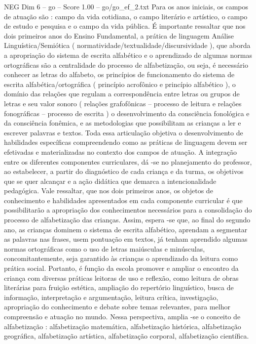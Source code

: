 \begin{textsample}{NEG Dim 6 – go – Score 1.00 – go/go\_ef\_2.txt}
Para os anos iniciais, os campos de atuação são : campo da vida cotidiana, o campo literário e artístico, o campo de estudo e pesquisa e o campo da vida pública.
É importante ressaltar que nos dois primeiros anos do Ensino Fundamental, a prática de linguagem Análise Linguística/Semiótica ( normatividade/textualidade/discursividade ), que aborda a apropriação do sistema de escrita alfabético e o aprendizado de algumas normas ortográficas são a centralidade do processo de alfabetização, ou seja, é necessário conhecer as letras do alfabeto, os princípios de funcionamento do sistema de escrita alfabética/ortográfica ( princípio acrofônico e princípio alfabético ), o domínio das relações que regulam a correspondência entre letras ou grupos de letras e seu valor sonoro ( relações grafofônicas – processo de leitura e relações fonográficas – processo de escrita ) o desenvolvimento da consciência fonológica e da consciência fonêmica, e as metodologias que possibilitam as crianças a ler e escrever palavras e textos.
Toda essa articulação objetiva o desenvolvimento de habilidades específicas compreendendo como as práticas de linguagem devem ser efetivadas e materializadas no contexto dos campos de atuação.
A integração entre os diferentes componentes curriculares, dá -se no planejamento do professor, ao estabelecer, a partir do diagnóstico de cada criança e da turma, os objetivos que se quer alcançar e a ação didática que demarca a intencionalidade pedagógica.
Vale ressaltar, que nos dois primeiros anos, os objetos de conhecimento e habilidades apresentados em cada componente curricular é que possibilitarão a apropriação dos conhecimentos necessários para a consolidação do processo de alfabetização das crianças.
Assim, espera -se que, ao final do segundo ano, as crianças dominem o sistema de escrita alfabético, aprendam a segmentar as palavras nas frases, usem pontuação em textos, já tenham aprendido algumas normas ortográficas como o uso de letras maiúsculas e minúsculas, concomitantemente, seja garantido às crianças o aprendizado da leitura como prática social.
Portanto, é função da escola promover e ampliar o encontro da criança com diversas práticas leitoras de uso e reflexão, como leitura de obras literárias para fruição estética, ampliação do repertório linguístico, busca de informação, interpretação e argumentação, leitura crítica, investigação, apropriação do conhecimento e debate sobre temas relevantes, para melhor compreensão e atuação no mundo.
Nessa perspectiva, amplia -se o conceito de alfabetização : alfabetização matemática, alfabetização histórica, alfabetização geográfica, alfabetização artística, alfabetização corporal, alfabetização científica.

\end{textsample}

